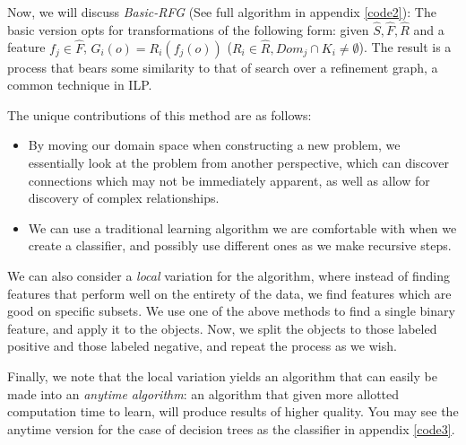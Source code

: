 \documentclass[letterpaper]{article}
\theoremstyle{definition}
\begin{document}
Now, we will discuss \emph{Basic-RFG} (See full algorithm in appendix \ref{code2}):
The basic version opts for transformations of the following form: given $\hat{S},\hat{F},\hat{R}$ and a feature $f_{j}\in \hat{F}$, $G_{i}(o)=R_{i}(f_{j}(o))$ ($R_{i}\in \hat{R},Dom_{j}\cap K_{i}\neq \emptyset$).
The result is a process that bears some similarity to that of search over a refinement graph\cite{dvzeroski2001introduction,van1998completeness}, a common technique in ILP.

The unique contributions of this method are as follows:
\begin{itemize}
    \item By moving our domain space when constructing a new problem, we essentially look at the problem from another perspective, which can discover connections which may not be immediately apparent, as well as allow for discovery of complex relationships.
    \item We can use a traditional learning algorithm we are comfortable with when we create a classifier, and possibly use different ones as we make recursive steps.
\end{itemize}

We can also consider a \emph{local} variation for the algorithm, where instead of finding features that perform well on the entirety of the data, we find features which are good on specific subsets. We use one of the above methods to find a single binary feature, and apply it to the objects. Now, we split the objects to those labeled positive and those labeled negative, and repeat the process as we wish.

Finally, we note that the local variation yields an algorithm that can easily be made into an \emph{anytime algorithm}: an algorithm that given more allotted computation time to learn, will produce results of higher quality\cite{zilberstein1996using}. You may see the anytime version for the case of decision trees as the classifier in appendix \ref{code3}.

\end{document}
